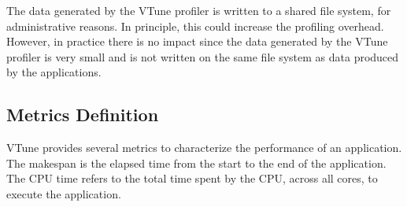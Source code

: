 \documentclass[conference]{IEEEtran}
\begin{document}
The data generated by the VTune profiler is written to a shared file system, for administrative reasons. In principle, this could increase the profiling overhead. However, in practice there is no impact since the data generated by the VTune profiler is very small and is not written on the same file system as data produced by the applications.
			
\subsection{Metrics Definition}
VTune provides several metrics to characterize the performance of an application.  The makespan is the elapsed time from the start to the end of the application. The CPU time refers to the total time spent by the CPU, across all cores, to execute the application. 
\end{document}
